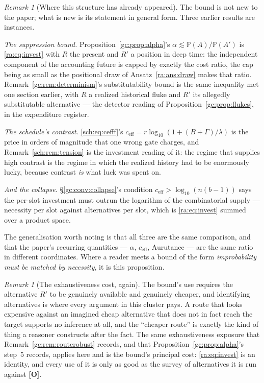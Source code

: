 \documentclass[11pt]{article}
\numberwithin{equation}{section}
\theoremstyle{plain}
\theoremstyle{definition}
\theoremstyle{remark}
\newtheorem{remark}[theorem]{Remark}
\newcommand{\PP}{\mathbb{P}}
\begin{document}
\begin{remark}[Where this structure has already appeared]
\label{ra:rem:investinstances}
The bound is not new to the paper; what is new is its statement in
general form. Three earlier results are instances.

\emph{The suppression bound.} Proposition~\ref{gc:prop:alpha}'s
$\alpha\lesssim\PP(A)/\PP(A')$ is \eqref{ra:eq:invest} with $R$ the
present and $R'$ a position in deep time: the independent component of
the accounting future is capped by exactly the cost ratio, the cap
being as small as the positional draw of Ansatz~\ref{ra:ans:draw}
makes that ratio. Remark~\ref{gc:rem:determinism}'s substitutability
bound is the same inequality met one section earlier, with $R$ a
realized historical fluke and $R'$ its allegedly substitutable
alternative --- the detector reading of
Proposition~\ref{gc:prop:flukes}, in the expenditure register.

\emph{The schedule's contrast.} \eqref{sch:eq:cefff}'s
$c_{\mathrm{eff}}=r\log_{10}(1+(B+\Gamma)/\lambda)$ is the price in
orders of magnitude that one wrong gate charges, and
Remark~\ref{sch:rem:tension} is the investment reading of it: the regime
that supplies high contrast is the regime in which the realized history
had to be enormously lucky, because contrast \emph{is} what luck was
spent on.

\emph{And the collapse.} \S\ref{gc:conv:collapse}'s condition
$c_{\mathrm{eff}}>\log_{10}(n(b-1))$ says the per-slot investment must
outrun the logarithm of the combinatorial supply --- necessity per slot
against alternatives per slot, which is \eqref{ra:eq:invest} summed over
a product space.

The generalisation worth noting is that all three are the same
comparison, and that the paper's recurring quantities --- $\alpha$,
$c_{\mathrm{eff}}$, Aurutance --- are the same ratio in different
coordinates. Where a reader meets a bound of the form \emph{improbability
must be matched by necessity}, it is this proposition.
\end{remark}

\begin{remark}[The exhaustiveness cost, again]\label{ra:rem:investcost}
The bound's use requires the alternative $R'$ to be genuinely available
and genuinely cheaper, and identifying alternatives is where every
argument in this cluster pays. A route that looks expensive against an
imagined cheap alternative that does not in fact reach the target
supports no inference at all, and the ``cheaper route'' is exactly the
kind of thing a reasoner constructs after the fact. The same
exhaustiveness exposure that Remark~\ref{gc:rem:routerobust} records, and
that Proposition~\ref{gc:prop:alpha}'s step~5 records, applies here and is
the bound's principal cost: \eqref{ra:eq:invest} is an identity, and
every use of it is only as good as the survey of alternatives it is run
against \textbf{[O]}.
\end{remark}
\end{document}
